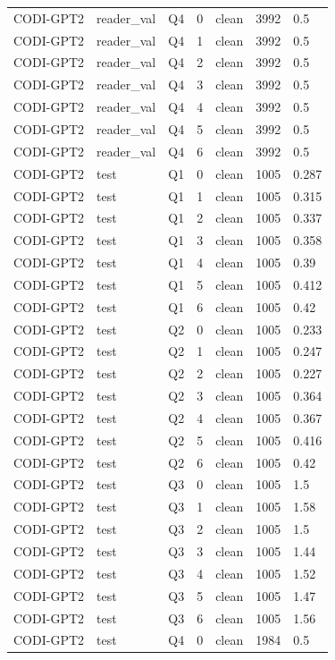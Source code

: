 \begin{longtable}{@{}p{}p{}p{}p{}p{}p{}p{}@{}}
CODI-GPT2 & reader\_val & Q4 & 0 & clean & 3992 & 0.5 \\
CODI-GPT2 & reader\_val & Q4 & 1 & clean & 3992 & 0.5 \\
CODI-GPT2 & reader\_val & Q4 & 2 & clean & 3992 & 0.5 \\
CODI-GPT2 & reader\_val & Q4 & 3 & clean & 3992 & 0.5 \\
CODI-GPT2 & reader\_val & Q4 & 4 & clean & 3992 & 0.5 \\
CODI-GPT2 & reader\_val & Q4 & 5 & clean & 3992 & 0.5 \\
CODI-GPT2 & reader\_val & Q4 & 6 & clean & 3992 & 0.5 \\
CODI-GPT2 & test & Q1 & 0 & clean & 1005 & 0.287 \\
CODI-GPT2 & test & Q1 & 1 & clean & 1005 & 0.315 \\
CODI-GPT2 & test & Q1 & 2 & clean & 1005 & 0.337 \\
CODI-GPT2 & test & Q1 & 3 & clean & 1005 & 0.358 \\
CODI-GPT2 & test & Q1 & 4 & clean & 1005 & 0.39 \\
CODI-GPT2 & test & Q1 & 5 & clean & 1005 & 0.412 \\
CODI-GPT2 & test & Q1 & 6 & clean & 1005 & 0.42 \\
CODI-GPT2 & test & Q2 & 0 & clean & 1005 & 0.233 \\
CODI-GPT2 & test & Q2 & 1 & clean & 1005 & 0.247 \\
CODI-GPT2 & test & Q2 & 2 & clean & 1005 & 0.227 \\
CODI-GPT2 & test & Q2 & 3 & clean & 1005 & 0.364 \\
CODI-GPT2 & test & Q2 & 4 & clean & 1005 & 0.367 \\
CODI-GPT2 & test & Q2 & 5 & clean & 1005 & 0.416 \\
CODI-GPT2 & test & Q2 & 6 & clean & 1005 & 0.42 \\
CODI-GPT2 & test & Q3 & 0 & clean & 1005 & 1.5 \\
CODI-GPT2 & test & Q3 & 1 & clean & 1005 & 1.58 \\
CODI-GPT2 & test & Q3 & 2 & clean & 1005 & 1.5 \\
CODI-GPT2 & test & Q3 & 3 & clean & 1005 & 1.44 \\
CODI-GPT2 & test & Q3 & 4 & clean & 1005 & 1.52 \\
CODI-GPT2 & test & Q3 & 5 & clean & 1005 & 1.47 \\
CODI-GPT2 & test & Q3 & 6 & clean & 1005 & 1.56 \\
CODI-GPT2 & test & Q4 & 0 & clean & 1984 & 0.5 \\

\end{longtable}
